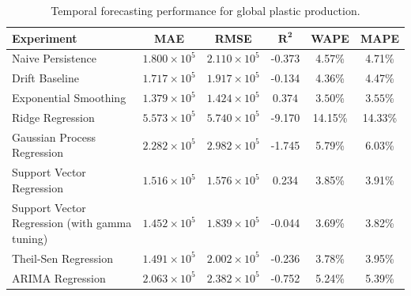 \begin{table}[!ht]
	\centering
	\caption{\centering Temporal forecasting performance for global plastic production.}
	\begin{tabular}{@{}lccccc@{}}
		\toprule
		\textbf{Experiment}                           & \textbf{MAE}          & \textbf{RMSE}         & $\mathbf{R^2}$     & \textbf{WAPE}       & \textbf{MAPE}       \\
		\midrule
		Naive Persistence                             & \(1.800 \times 10^5\) & \(2.110 \times 10^5\) & -0.373             & 4.57\%              & 4.71\%              \\
		Drift Baseline                                & \(1.717 \times 10^5\) & \(1.917 \times 10^5\) & -0.134             & 4.36\%              & 4.47\%              \\
		Exponential Smoothing                         & \(1.379 \times 10^5\) & \(1.424 \times 10^5\) & \(\mathbf{0.374}\) & \(\mathbf{3.50}\)\% & \(\mathbf{3.55}\)\% \\
		Ridge Regression                              & \(5.573 \times 10^5\) & \(5.740 \times 10^5\) & -9.170             & 14.15\%             & 14.33\%             \\
		Gaussian Process Regression                   & \(2.282 \times 10^5\) & \(2.982 \times 10^5\) & -1.745             & 5.79\%              & 6.03\%              \\
		Support Vector Regression                     & \(1.516 \times 10^5\) & \(1.576 \times 10^5\) & 0.234              & 3.85\%              & 3.91\%              \\
		Support Vector Regression (with gamma tuning) & \(1.452 \times 10^5\) & \(1.839 \times 10^5\) & -0.044             & 3.69\%              & 3.82\%              \\
		Theil-Sen Regression                          & \(1.491 \times 10^5\) & \(2.002 \times 10^5\) & -0.236             & 3.78\%              & 3.95\%              \\
		ARIMA Regression                              & \(2.063 \times 10^5\) & \(2.382 \times 10^5\) & -0.752             & 5.24\%              & 5.39\%              \\
		\hline
	\end{tabular}
	\label{tab:japan_pwg_forecasting_metric_table}
\end{table}

